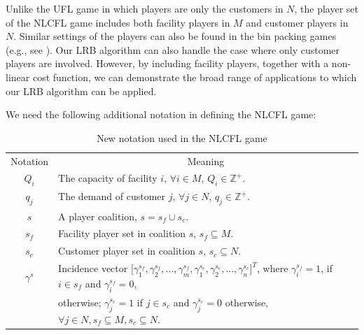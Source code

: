\documentclass[ijoc,nonblindrev]{informs3} %
\newcommand{\Z}{\mathbb{Z}}
\begin{document}
Unlike the UFL game in which players are only the customers in $N$, the player set of the NLCFL game includes both facility players in $M$ and customer players in $N$. Similar settings of the players can also be found in the bin packing games (e.g., see \citealt{Faigle1993,Liu2009}).
Our LRB algorithm can also handle the case where only customer players are involved. However, by including facility players, together with a non-linear cost function, we can demonstrate the broad range of applications to which our LRB algorithm can be applied.


We need the following additional notation in defining the NLCFL game:
\begin{table}[H]
\vspace{-2mm}
\centering
\tabcolsep=7pt
\small
\renewcommand\arraystretch{1.5}
\caption{\label{table:notations} New notation used in the NLCFL game}
\begin{tabular}[!h]{c c}
\hline
\multicolumn{1}{c}{Notation} &\multicolumn{1}{c}{Meaning}\\
\cline{1-2}
\multicolumn{1}{c}{$Q_i$} &\multicolumn{1}{l}{The capacity of facility $i$, $\forall i \in M$, $Q_i \in \Z^+$.}\\
\multicolumn{1}{c}{$q_j$} &\multicolumn{1}{l}{The demand of customer $j$, $\forall j \in N$, $q_j \in \Z^+$.}\\
\multicolumn{1}{c}{$s$} &\multicolumn{1}{l}{A player coalition, $s = s_f \cup s_c$.}\\
\multicolumn{1}{c}{$s_f$} &\multicolumn{1}{l}{Facility player set in coalition $s$, $s_f \subseteq M$.}\\
\multicolumn{1}{c}{$s_c$} &\multicolumn{1}{l}{Customer player set in coalition $s$, $s_c \subseteq N$.}\\
\multicolumn{1}{c}{$\gamma^s$} &\multicolumn{1}{l}{Incidence vector $\big[ \gamma^{s_f}_1,\gamma^{s_f}_2,...,\gamma^{s_f}_{m},\gamma^{s_c}_{1},\gamma^{s_c}_{2},...,\gamma^{s_c}_{n} \big]^T$, where $\gamma^{s_f}_i=1$, if $i \in s_f$ and $\gamma^{s_f}_i=0$, }\\
\multicolumn{1}{c}{} &\multicolumn{1}{l}{otherwise; $\gamma^{s_c}_j=1$ if $j \in s_c$ and $\gamma^{s_c}_j=0$ otherwise, $\forall j \in N, s_f \subseteq M, s_c \subseteq N$.}\\
\hline
\end{tabular}
\vspace{-3mm}
\end{table}
\end{document}
